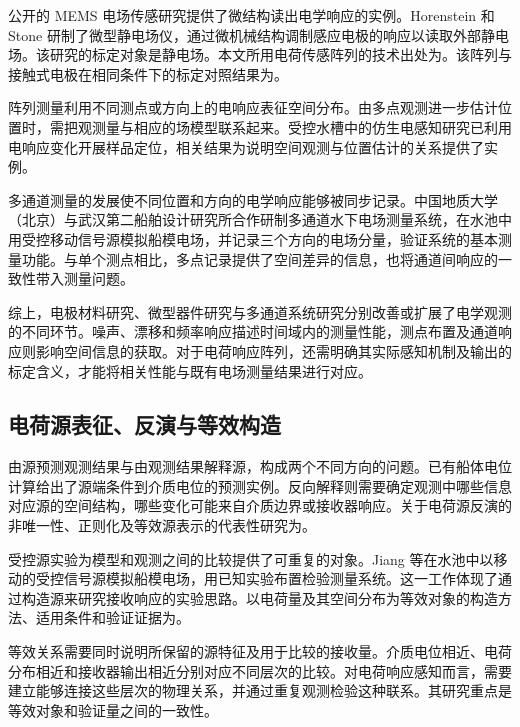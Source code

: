 公开的 MEMS 电场传感研究提供了微结构读出电学响应的实例。Horenstein 和 Stone 研制了微型静电场仪，通过微机械结构调制感应电极的响应以读取外部静电场\cite{horenstein2001mems}。该研究的标定对象是静电场。本文所用电荷传感阵列的技术出处为\underline{\hspace{5em}}。该阵列与接触式电极在相同条件下的标定对照结果为\underline{\hspace{5em}}。

阵列测量利用不同测点或方向上的电响应表征空间分布。由多点观测进一步估计位置时，需把观测量与相应的场模型联系起来。受控水槽中的仿生电感知研究已利用电响应变化开展样品定位\cite{solberg2008}，相关结果为说明空间观测与位置估计的关系提供了实例。

多通道测量的发展使不同位置和方向的电学响应能够被同步记录。中国地质大学（北京）与武汉第二船舶设计研究所合作研制多通道水下电场测量系统，在水池中用受控移动信号源模拟船模电场，并记录三个方向的电场分量，验证系统的基本测量功能\cite{jiang2024}。与单个测点相比，多点记录提供了空间差异的信息，也将通道间响应的一致性带入测量问题。

综上，电极材料研究、微型器件研究与多通道系统研究分别改善或扩展了电学观测的不同环节。噪声、漂移和频率响应描述时间域内的测量性能，测点布置及通道响应则影响空间信息的获取。对于电荷响应阵列，还需明确其实际感知机制及输出的标定含义，才能将相关性能与既有电场测量结果进行对应。

\subsection{电荷源表征、反演与等效构造}

由源预测观测结果与由观测结果解释源，构成两个不同方向的问题。已有船体电位计算给出了源端条件到介质电位的预测实例\cite{zamani1988,wang2018corrosion}。反向解释则需要确定观测中哪些信息对应源的空间结构，哪些变化可能来自介质边界或接收器响应。关于电荷源反演的非唯一性、正则化及等效源表示的代表性研究为\underline{\hspace{6em}}。

受控源实验为模型和观测之间的比较提供了可重复的对象。Jiang 等在水池中以移动的受控信号源模拟船模电场，用已知实验布置检验测量系统\cite{jiang2024}。这一工作体现了通过构造源来研究接收响应的实验思路。以电荷量及其空间分布为等效对象的构造方法、适用条件和验证证据为\underline{\hspace{6em}}。

等效关系需要同时说明所保留的源特征及用于比较的接收量。介质电位相近、电荷分布相近和接收器输出相近分别对应不同层次的比较。对电荷响应感知而言，需要建立能够连接这些层次的物理关系，并通过重复观测检验这种联系。其研究重点是等效对象和验证量之间的一致性。

